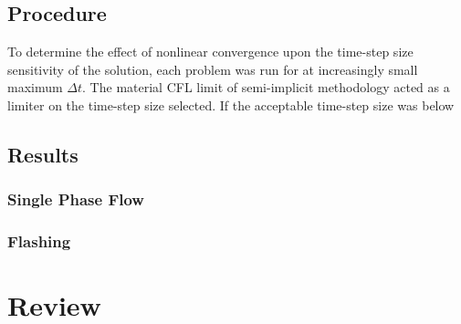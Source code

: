 \subsection{Procedure}
\label{subsect:experiments_procedure}
To determine the effect of nonlinear convergence upon the time-step size sensitivity of the solution, each problem was run for at increasingly small maximum $\Delta t$.
The material CFL limit of semi-implicit methodology acted as a limiter on the time-step size selected.
If the acceptable time-step size was below

\subsection{Results}
\label{subsect:results}


\subsubsection{Single Phase Flow}
\label{subsubsect:results_single}


\subsubsection{Flashing}
\label{subsubsect:results_flashing}

\section{Review}
\label{sect:scaling_review}

